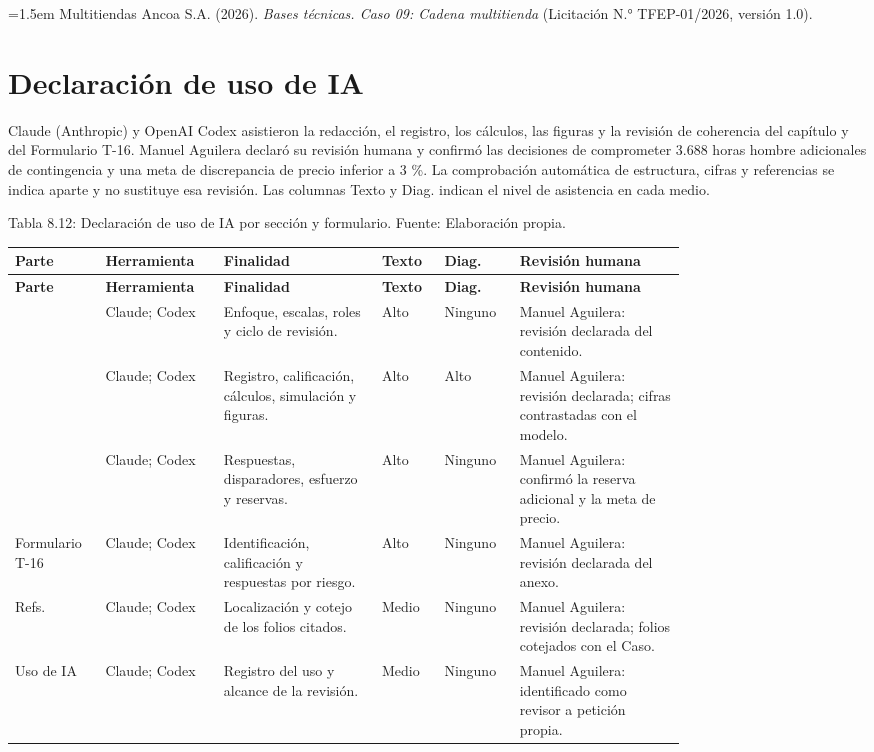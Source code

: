 \documentclass[11pt]{article}
\begin{document}
\noindent\hangindent=1.5em Multitiendas Ancoa S.A. (2026). \textit{Bases técnicas. Caso 09: Cadena multitienda} (Licitación N.° TFEP-01/2026, versión 1.0).

\section*{Declaración de uso de IA}

Claude (Anthropic) y OpenAI Codex asistieron la redacción, el registro, los cálculos, las figuras y la revisión de coherencia del capítulo y del Formulario T-16. Manuel Aguilera declaró su revisión humana y confirmó las decisiones de comprometer 3.688 horas hombre adicionales de contingencia y una meta de discrepancia de precio inferior a 3 \%. La comprobación automática de estructura, cifras y referencias se indica aparte y no sustituye esa revisión. Las columnas Texto y Diag. indican el nivel de asistencia en cada medio.

Tabla 8.12: Declaración de uso de IA por sección y formulario. Fuente: Elaboración propia.\label{tab:8-12}

\begin{longtable}{>{\raggedright\arraybackslash}p{0.085\linewidth}>{\raggedright\arraybackslash}p{0.130\linewidth}>{\raggedright\arraybackslash}p{0.200\linewidth}>{\raggedright\arraybackslash}p{0.075\linewidth}>{\raggedright\arraybackslash}p{0.080\linewidth}>{\raggedright\arraybackslash}p{0.215\linewidth}}
\toprule
\textbf{Parte} & \textbf{Herramienta} & \textbf{Finalidad} & \textbf{Texto} & \textbf{Diag.} & \textbf{Revisión humana} \\
\midrule
\endfirsthead
\toprule
\textbf{Parte} & \textbf{Herramienta} & \textbf{Finalidad} & \textbf{Texto} & \textbf{Diag.} & \textbf{Revisión humana} \\
\midrule
\endhead
\bottomrule
\endlastfoot
8.1 & Claude; Codex & Enfoque, escalas, roles y ciclo de revisión. & Alto & Ninguno & Manuel Aguilera: revisión declarada del contenido. \\
8.2 & Claude; Codex & Registro, calificación, cálculos, simulación y figuras. & Alto & Alto & Manuel Aguilera: revisión declarada; cifras contrastadas con el modelo. \\
8.3 & Claude; Codex & Respuestas, disparadores, esfuerzo y reservas. & Alto & Ninguno & Manuel Aguilera: confirmó la reserva adicional y la meta de precio. \\
Formulario T-16 & Claude; Codex & Identificación, calificación y respuestas por riesgo. & Alto & Ninguno & Manuel Aguilera: revisión declarada del anexo. \\
Refs. & Claude; Codex & Localización y cotejo de los folios citados. & Medio & Ninguno & Manuel Aguilera: revisión declarada; folios cotejados con el Caso. \\
Uso de IA & Claude; Codex & Registro del uso y alcance de la revisión. & Medio & Ninguno & Manuel Aguilera: identificado como revisor a petición propia. \\
\end{longtable}
\end{document}
